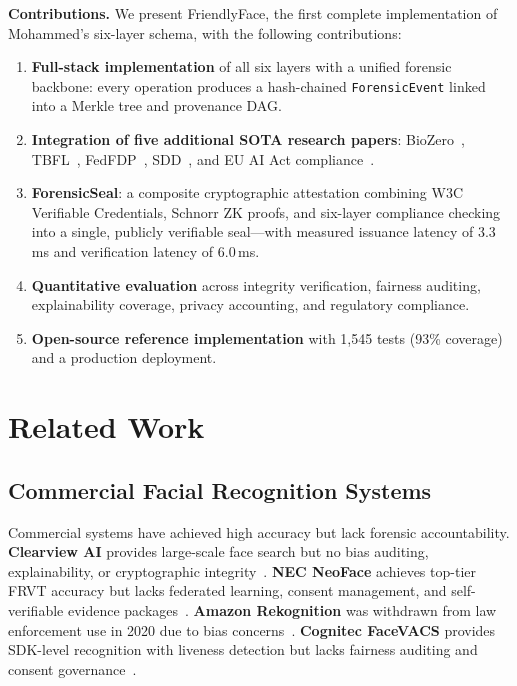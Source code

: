 \documentclass[conference]{IEEEtran}
\begin{document}
\textbf{Contributions.} We present FriendlyFace, the first complete implementation of Mohammed's six-layer schema, with the following contributions:

\begin{enumerate}[leftmargin=*]
\item \textbf{Full-stack implementation} of all six layers with a unified forensic backbone: every operation produces a hash-chained \texttt{ForensicEvent} linked into a Merkle tree and provenance DAG.

\item \textbf{Integration of five additional SOTA research papers}: BioZero~\cite{biozero2024}, TBFL~\cite{tbfl2026}, FedFDP~\cite{feddp2024}, SDD~\cite{sdd2025}, and EU AI Act compliance~\cite{euaiact2025}.

\item \textbf{ForensicSeal}: a composite cryptographic attestation combining W3C Verifiable Credentials, Schnorr ZK proofs, and six-layer compliance checking into a single, publicly verifiable seal---with measured issuance latency of 3.3\,ms and verification latency of 6.0\,ms.

\item \textbf{Quantitative evaluation} across integrity verification, fairness auditing, explainability coverage, privacy accounting, and regulatory compliance.

\item \textbf{Open-source reference implementation} with 1,545 tests (93\% coverage) and a production deployment.
\end{enumerate}

\section{Related Work}

\subsection{Commercial Facial Recognition Systems}

Commercial systems have achieved high accuracy but lack forensic accountability. \textbf{Clearview AI} provides large-scale face search but no bias auditing, explainability, or cryptographic integrity~\cite{hill2020clearview}. \textbf{NEC NeoFace} achieves top-tier FRVT accuracy but lacks federated learning, consent management, and self-verifiable evidence packages~\cite{nec2023}. \textbf{Amazon Rekognition} was withdrawn from law enforcement use in 2020 due to bias concerns~\cite{aws2023}. \textbf{Cognitec FaceVACS} provides SDK-level recognition with liveness detection but lacks fairness auditing and consent governance~\cite{cognitec2023}.
\end{document}
